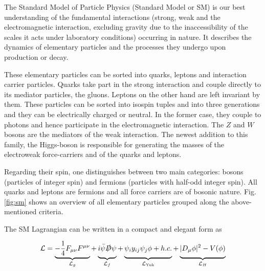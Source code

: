 \label{ch:theory}


The Standard Model of Particle Physics (Standard Model or SM) is our best understanding of the fundamental interactions (strong, weak and the electromagnetic interaction, excluding gravity due to the inaccessibility of the scales it acts under laboratory conditions) occurring in nature. It describes the dynamics of elementary particles and the processes they undergo upon production or decay.

These elementary particles can be sorted into quarks, leptons and interaction carrier particles. Quarks take part in the strong interaction and couple directly to its mediator particles, the gluons. Leptons on the other hand are left invariant by them. These particles can be sorted into isospin tuples and into three generations and they can be electrically charged or neutral. In the former case, they couple to photons and hence participate in the electromagnetic interaction. The $Z$ and $W$ bosons are the mediators of the weak interaction. The newest addition to this family, the Higgs-boson is responsible for generating the masses of the electroweak force-carriers and of the quarks and leptons.

Regarding their spin, one distinguishes between two main categories: bosons (particles of integer spin) and fermions (particles with half-odd integer spin). All quarks and leptons are fermions and all force carriers are of bosonic nature. Fig. \ref{fig:sm} shows an overview of all elementary particles grouped along the above-mentioned criteria.


The SM Lagrangian can be written in a compact and elegant form as


\begin{equation}
		\mathcal{L} = \underbrace{-\frac{1}{4}F_{\mu\nu}F^{\mu\nu}}_{\mathcal{L}_g} + \underbrace{\vphantom{-\frac{1}{4}F_{\mu\nu}F^{\mu\nu}}i \bar{\psi}\slashed{D}\psi}_{\mathcal{L}_f} + \underbrace{\vphantom{-\frac{1}{4}F_{\mu\nu}F^{\mu\nu}}\psi_iy_{ij}\psi_j\phi + h.c.}_{\mathcal{L}_\text{Yuk}} + \underbrace{\vphantom{-\frac{1}{4}F_{\mu\nu}F^{\mu\nu}}|D_\mu\phi|^2 - V(\phi)}_{\mathcal{L}_H}
	\label{eq:lagrangian}
\end{equation}

